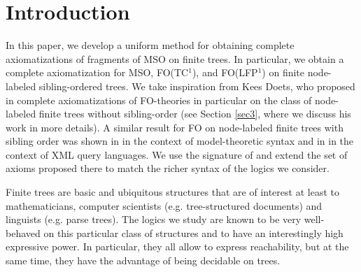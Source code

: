 \documentclass{LMCS}
\newcommand{\xml}{\textsf{XML}\xspace}
\newcommand{\fo}{\textsf{FO}\xspace}
\newcommand{\mso}{\textsf{MSO}\xspace}
\newcommand{\fotc}{\textsf{FO(TC$^1$)}\xspace}
\newcommand{\folfp}{\textsf{FO(LFP$^1$)}\xspace}
\begin{document}
\section{Introduction}



In this paper, we develop a uniform method for obtaining
complete axiomatizations of fragments of \mso on finite trees. In
particular, we obtain a complete axiomatization for \mso, \fotc,
and \folfp on finite node-labeled sibling-ordered trees. We take
inspiration from Kees Doets, who proposed in \cite{1987}
complete axiomatizations of \fo-theories in particular on the class of
node-labeled finite trees without sibling-order  
(see Section \ref{sec3}, where we discuss his work in more details). A similar result
for \fo on node-labeled finite trees with sibling order was
shown in \cite{1995} in the context of model-theoretic syntax
and in \cite{07} in the context of \xml query languages. We use the signature of \cite{07}
and extend the set of axioms proposed there to match the richer syntax of the logics we consider.

Finite trees are basic and ubiquitous structures that are of
interest at least to mathematicians, computer scientists
(e.g. tree-structured documents) and linguists (e.g. parse trees). The
logics we study are known to be very well-behaved on this
particular class of structures and to have an interestingly high
expressive power. In particular, they all allow to express
reachability, but at the same time, they have the advantage of
being decidable on trees.
\end{document}
